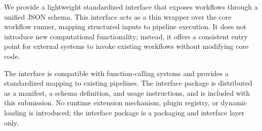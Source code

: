 We provide a lightweight standardized interface that exposes workflows through a unified JSON schema. This interface acts as a thin wrapper over the core workflow runner, mapping structured inputs to pipeline execution. It does not introduce new computational functionality; instead, it offers a consistent entry point for external systems to invoke existing workflows without modifying core code.

The interface is compatible with function-calling systems and provides a standardized mapping to existing pipelines. The interface package is distributed as a manifest, a schema definition, and usage instructions, and is included with this submission. No runtime extension mechanism, plugin registry, or dynamic loading is introduced; the interface package is a packaging and interface layer only.